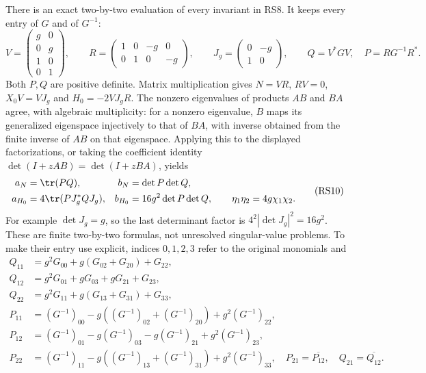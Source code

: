 There is an exact two-by-two evaluation of every invariant in RS8.
It keeps every entry of $G$ and of $G^{-1}$:
\begin{equation}
 V=\begin{pmatrix}g&0\\0&g\\1&0\\0&1\end{pmatrix},\qquad
 R=\begin{pmatrix}1&0&-g&0\\0&1&0&-g\end{pmatrix},\qquad
 J_g=\begin{pmatrix}0&-g\\1&0\end{pmatrix},\qquad
 Q=V^*GV,\quad P=RG^{-1}R^*.
 \tag{RS9}
\end{equation}
Both $P,Q$ are positive definite. Matrix multiplication gives
$N=VR$, $RV=0$, $X_0V=VJ_g$ and $H_0=-2VJ_gR$.
The nonzero eigenvalues of products $AB$ and $BA$ agree, with
algebraic multiplicity: for a nonzero eigenvalue, $B$ maps its
generalized eigenspace injectively to that of $BA$, with inverse
obtained from the finite inverse of $AB$ on that eigenspace.
Applying this to the displayed factorizations, or taking the
coefficient identity $\det(I+zAB)=\det(I+zBA)$, yields
\begin{equation}
 \begin{aligned}
 a_N&=\tr(PQ),& b_N&=\det P\det Q,\\
 a_{H_0}&=4\tr(PJ_g^*QJ_g),&
 b_{H_0}&=16g^2\det P\det Q,\qquad
 \eta_1\eta_2=4g\chi_1\chi_2.
 \end{aligned}
 \tag{RS10}
\end{equation}
For example $\det J_g=g$, so the last determinant factor is
$4^2|\det J_g|^2=16g^2$. These are finite two-by-two formulas,
not unresolved singular-value problems. To make their entry use
explicit, indices $0,1,2,3$ refer to the original monomials and
\begin{equation}
 \begin{aligned}
 Q_{11}&=g^2G_{00}+g(G_{02}+G_{20})+G_{22},\\
 Q_{12}&=g^2G_{01}+gG_{03}+gG_{21}+G_{23},\\
 Q_{22}&=g^2G_{11}+g(G_{13}+G_{31})+G_{33},\\
 P_{11}&=(G^{-1})_{00}-g((G^{-1})_{02}+(G^{-1})_{20})
                                      +g^2(G^{-1})_{22},\\
 P_{12}&=(G^{-1})_{01}-g(G^{-1})_{03}-g(G^{-1})_{21}
                                      +g^2(G^{-1})_{23},\\
 P_{22}&=(G^{-1})_{11}-g((G^{-1})_{13}+(G^{-1})_{31})
                                      +g^2(G^{-1})_{33},
 \quad P_{21}=\overline{P_{12}},\quad Q_{21}=\overline{Q_{12}}.
 \end{aligned}
 \tag{RS11}
\end{equation}

